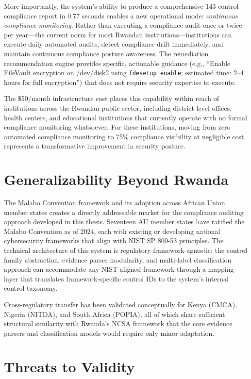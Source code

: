 \documentclass[12pt,oneside]{report}
\begin{document}
More importantly, the system's ability to produce a comprehensive 143-control compliance report in 0.77 seconds enables a new operational mode: \textit{continuous compliance monitoring}. Rather than executing a compliance audit once or twice per year—the current norm for most Rwandan institutions—institutions can execute daily automated audits, detect compliance drift immediately, and maintain continuous compliance posture awareness. The remediation recommendation engine provides specific, actionable guidance (e.g., ``Enable FileVault encryption on /dev/disk2 using \texttt{fdesetup enable}; estimated time: 2--4 hours for full encryption'') that does not require security expertise to execute.

The \$50/month infrastructure cost places this capability within reach of institutions across the Rwandan public sector, including district-level offices, health centers, and educational institutions that currently operate with no formal compliance monitoring whatsoever. For these institutions, moving from zero automated compliance monitoring to 75\% compliance visibility at negligible cost represents a transformative improvement in security posture.

\section{Generalizability Beyond Rwanda}

The Malabo Convention framework and its adoption across African Union member states creates a directly addressable market for the compliance auditing approach developed in this thesis. Seventeen AU member states have ratified the Malabo Convention as of 2024, each with existing or developing national cybersecurity frameworks that align with NIST SP 800-53 principles. The technical architecture of this system is regulatory-framework-agnostic: the control family abstraction, evidence parser modularity, and multi-label classification approach can accommodate any NIST-aligned framework through a mapping layer that translates framework-specific control IDs to the system's internal control taxonomy.

Cross-regulatory transfer has been validated conceptually for Kenya (CMCA), Nigeria (NITDA), and South Africa (POPIA), all of which share sufficient structural similarity with Rwanda's NCSA framework that the core evidence parsers and classification models would require only minor adaptation.

\section{Threats to Validity}
\end{document}
